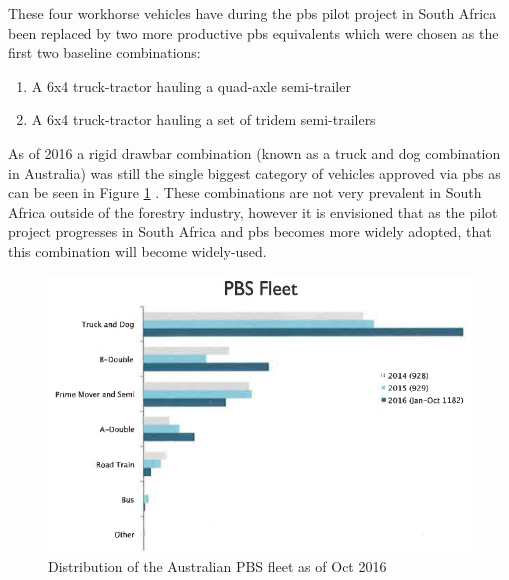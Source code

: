 These four workhorse vehicles have during the \gls{pbs} pilot project in South Africa been replaced by two more productive \gls{pbs} equivalents which were chosen as the first two baseline combinations:

\begin{enumerate}
	\item A 6x4 truck-tractor hauling a quad-axle semi-trailer
	\item A 6x4 truck-tractor hauling a set of tridem semi-trailers
\end{enumerate}

As of 2016 a rigid drawbar combination (known as a truck and dog combination in Australia) was still the single biggest category of vehicles approved via \gls{pbs} as can be seen in Figure \ref{figure:distribution-of-australian-pbs-fleet} \cite{Grote2017}. These combinations are not very prevalent in South Africa outside of the forestry industry, however it is envisioned that as the pilot project progresses in South Africa and \gls{pbs} becomes more widely adopted, that this combination will become widely-used.

\begin{figure}[H]
	\centering
	\includegraphics[width=1\textwidth]{fig/globaltrailermag_truck-and-dog-pbs-fleet-australia}
	\caption{Distribution of the Australian PBS fleet as of Oct 2016 \cite{Grote2017}}
	\label{figure:distribution-of-australian-pbs-fleet}
\end{figure}

